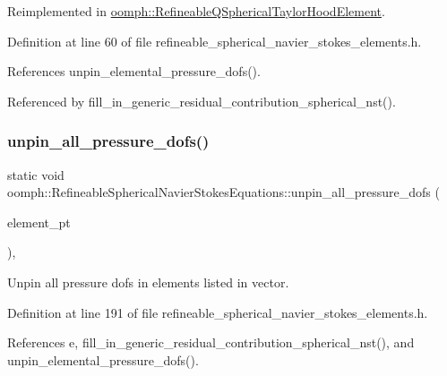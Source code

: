 Reimplemented in \hyperlink{classoomph_1_1RefineableQSphericalTaylorHoodElement_a41a9632ac4bafa843dd8e3cf291ab390}{oomph\+::\+Refineable\+Q\+Spherical\+Taylor\+Hood\+Element}.



Definition at line 60 of file refineable\+\_\+spherical\+\_\+navier\+\_\+stokes\+\_\+elements.\+h.



References unpin\+\_\+elemental\+\_\+pressure\+\_\+dofs().



Referenced by fill\+\_\+in\+\_\+generic\+\_\+residual\+\_\+contribution\+\_\+spherical\+\_\+nst().

\mbox{\label{classoomph_1_1RefineableSphericalNavierStokesEquations_a935603318e526f29c8f91487156369ff}} 
\subsubsection{\texorpdfstring{unpin\+\_\+all\+\_\+pressure\+\_\+dofs()}{unpin\_all\_pressure\_dofs()}}
{\footnotesize\ttfamily static void oomph\+::\+Refineable\+Spherical\+Navier\+Stokes\+Equations\+::unpin\+\_\+all\+\_\+pressure\+\_\+dofs (\begin{DoxyParamCaption}\item[{const \hyperlink{classoomph_1_1Vector}{Vector}$<$ \hyperlink{classoomph_1_1GeneralisedElement}{Generalised\+Element} $\ast$$>$ \&}]{element\+\_\+pt }\end{DoxyParamCaption})\hspace{0.3cm}{\ttfamily [inline]}, {\ttfamily [static]}}



Unpin all pressure dofs in elements listed in vector. 



Definition at line 191 of file refineable\+\_\+spherical\+\_\+navier\+\_\+stokes\+\_\+elements.\+h.



References e, fill\+\_\+in\+\_\+generic\+\_\+residual\+\_\+contribution\+\_\+spherical\+\_\+nst(), and unpin\+\_\+elemental\+\_\+pressure\+\_\+dofs().

